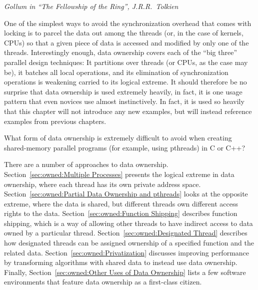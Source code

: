 
%
	 {\emph{Gollum in ``The Fellowship of the Ring'', J.R.R.~Tolkien}}

One of the simplest ways to avoid the synchronization overhead that
comes with locking is to parcel the data out among the threads (or,
in the case of kernels, CPUs)
so that a given piece of data is accessed and modified by only one
of the threads.
Interestingly enough, data ownership covers each of the ``big three''
parallel design techniques:
It partitions over threads (or CPUs, as the case may be),
it batches all local operations,
and its elimination of synchronization operations is weakening
carried to its logical extreme.
It should therefore be no surprise that data ownership is used extremely
heavily, in fact, it is one usage pattern that even novices use almost
instinctively.
In fact, it is used so heavily that this chapter will not introduce
any new examples, but will instead reference examples from previous
chapters.

\QuickQuiz{}
	What form of data ownership is extremely difficult
	to avoid when creating shared-memory parallel programs
	(for example, using pthreads) in C or C++?
 \QuickQuizEnd

There are a number of approaches to data ownership.
Section~\ref{sec:owned:Multiple Processes} presents the logical extreme
in data ownership, where each thread has its own private address space.
Section~\ref{sec:owned:Partial Data Ownership and pthreads} looks at
the opposite extreme, where the data is shared, but different threads
own different access rights to the data.
Section~\ref{sec:owned:Function Shipping} describes function shipping,
which is a way of allowing other threads to have indirect access to
data owned by a particular thread.
Section~\ref{sec:owned:Designated Thread} describes how designated
threads can be assigned ownership of a specified function and the
related data.
Section~\ref{sec:owned:Privatization} discusses improving performance
by transforming algorithms with shared data to instead use data ownership.
Finally, Section~\ref{sec:owned:Other Uses of Data Ownership} lists
a few software environments that feature data ownership as a
first-class citizen.

